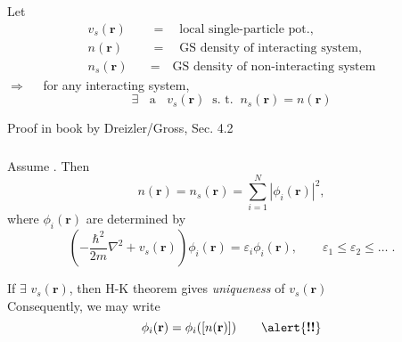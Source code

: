 \documentclass[compress]{beamer}
\begin{document}
\frame
{ 
  \frametitle{}
  \begin{small}
    {\scriptsize


      \begin{theorem}
        Let 
        \begin{align}
          v_{s}(\mathbf{r})\quad &= \quad \text{local single-particle pot.}, \nonumber \\
          n(\mathbf{r})\quad &=\quad \text{GS density of interacting system}, \nonumber \\
          n_{s}(\mathbf{r})\quad &=\quad \text{GS density of non-interacting system} \nonumber 
        \end{align}
        $\Longrightarrow \quad $ for \alert{any interacting system},
        \begin{equation}
          \exists \;\; \text{ a }\;\; v_{s}(\mathbf{r}) \;\; \text{s. t.} \;\; n_{s}(\mathbf{r})=n(\mathbf{r})  \nonumber
        \end{equation}
      \end{theorem}
      Proof in book by Dreizler/Gross, Sec. 4.2 \\
    }
  \end{small}
}

\frame
{ 
  \frametitle{}
  \begin{small}
    {\scriptsize
      Assume . Then
      \begin{equation}
        n(\mathbf{r})=n_{s}(\mathbf{r})=\sum_{i=1}^{N}\left\vert \phi_{i}(\mathbf{r})\right\vert^{2}, \nonumber
      \end{equation}
      where $\phi_{i}(\mathbf{r})$ are determined by
      \begin{equation}
        \left( -\frac{\hbar^{2}}{2m}\nabla^{2}+v_{s}(\mathbf{r})\right)\phi_{i}(\mathbf{r})=\varepsilon_{i}\phi_{i}(\mathbf{r}), \qquad \varepsilon_{1}\leq \varepsilon_{2}\leq \dots \;. \nonumber
      \end{equation}

      \vspace{12mm}
      If $\exists $ $v_{s}(\mathbf{r})$, then H-K theorem gives \emph{uniqueness} of $v_{s}(\mathbf{r})$ \\
      Consequently, we may write
      \begin{equation}
        \phi_{i}(\mathbf{r})=\phi_{i}([n(\mathbf{r})]) \qquad \alert{\textbf{!!}} \nonumber
      \end{equation}
      
    }
  \end{small}
}
\end{document}
